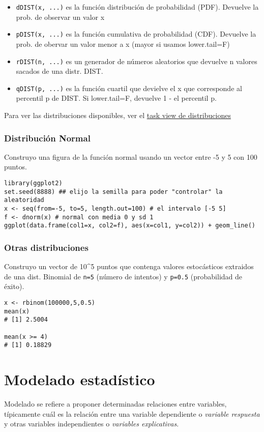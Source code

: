 \documentclass[11pt]{article}
\begin{document}
\begin{itemize}
\item \texttt{dDIST(x, ...)} es la función distribución de probabilidad (PDF). Devuelve la prob. de observar un
valor x
\item \texttt{pDIST(x, ...)} es la función cumulativa de probabilidad (CDF). Devuelve la prob. de obervar un
valor menor a x (mayor si usamos lower.tail=F)
\item \texttt{rDIST(n, ...)} es un generador de números aleatorios que devuelve n valores sacados de una distr. DIST.
\item \texttt{qDIST(p, ...)} es la función cuartil que devielve el x que corresponde al percentil p de DIST. Si
lower.tail=F, devuelve 1 - el percentil p.
\end{itemize}

Para ver las distribuciones disponibles, ver el \href{https://cran.r-project.org/web/views/Distributions.html}{task view de distribuciones}
\subsubsection*{Distribución Normal}
\label{sec:org44b0d8d}
Construyo una figura de la función normal usando un vector entre -5 y 5 con 100 puntos.

\begin{verbatim}
library(ggplot2)
set.seed(8888) ## elijo la semilla para poder "controlar" la aleatoridad
x <- seq(from=-5, to=5, length.out=100) # el intervalo [-5 5]
f <- dnorm(x) # normal con media 0 y sd 1 
ggplot(data.frame(col1=x, col2=f), aes(x=col1, y=col2)) + geom_line()
\end{verbatim}
\subsubsection*{Otras distribuciones}
\label{sec:org32c5a75}
Construyo un vector de 10\^{}5 puntos que contenga valores estocásticos extraidos de una dist. Binomial
de \texttt{n=5} (número de intentos) y \texttt{p=0.5} (probabilidad de éxito).

\begin{verbatim}
x <- rbinom(100000,5,0.5)
mean(x)
# [1] 2.5004

mean(x >= 4)
# [1] 0.18829
\end{verbatim}
\section*{Modelado estadístico}
\label{sec:org2164d47}
Modelado se refiere a proponer determinadas relaciones entre variables, típicamente cuál es la
relación entre una variable dependiente o \emph{variable respuesta} y otras variables independientes o
\emph{variables explicativas}. 
\end{document}
